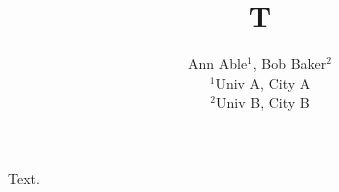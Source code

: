 \documentclass{nosuchclass}
\begin{document}
\title{T}
\author{Ann Able$^{1}$, Bob Baker$^{2}$\\ $^{1}$Univ A, City A\\ $^{2}$Univ B, City B}
\maketitle
Text.
\end{document}
